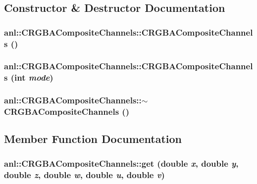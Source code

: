 \subsection{Constructor \& Destructor Documentation}
\hypertarget{classanl_1_1CRGBACompositeChannels_a26a38641c67d80d215347e481ff98223}{
\subsubsection[{CRGBACompositeChannels}]{\setlength{\rightskip}{0pt plus 5cm}anl::CRGBACompositeChannels::CRGBACompositeChannels ()}}
\label{classanl_1_1CRGBACompositeChannels_a26a38641c67d80d215347e481ff98223}
\hypertarget{classanl_1_1CRGBACompositeChannels_ad332ce5fa4b819216b6a9b6e4146c50e}{
\subsubsection[{CRGBACompositeChannels}]{\setlength{\rightskip}{0pt plus 5cm}anl::CRGBACompositeChannels::CRGBACompositeChannels (int {\em mode})}}
\label{classanl_1_1CRGBACompositeChannels_ad332ce5fa4b819216b6a9b6e4146c50e}
\hypertarget{classanl_1_1CRGBACompositeChannels_a6861fbee62224a5b93c6e9b20838ca76}{
\subsubsection[{$\sim$CRGBACompositeChannels}]{\setlength{\rightskip}{0pt plus 5cm}anl::CRGBACompositeChannels::$\sim$CRGBACompositeChannels ()}}
\label{classanl_1_1CRGBACompositeChannels_a6861fbee62224a5b93c6e9b20838ca76}


\subsection{Member Function Documentation}
\hypertarget{classanl_1_1CRGBACompositeChannels_a2597ea3895f3389a713fbe79232ffeff}{
\subsubsection[{get}]{ anl::CRGBACompositeChannels::get (double {\em x}, \/  double {\em y}, \/  double {\em z}, \/  double {\em w}, \/  double {\em u}, \/  double {\em v})}}
\label{classanl_1_1CRGBACompositeChannels_a2597ea3895f3389a713fbe79232ffeff}


